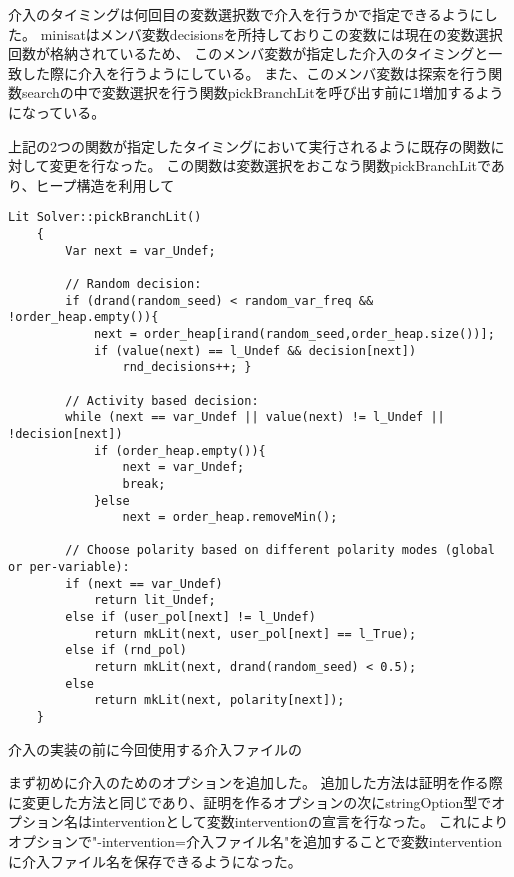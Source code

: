 介入のタイミングは何回目の変数選択数で介入を行うかで指定できるようにした。
minisatはメンバ変数decisionsを所持しておりこの変数には現在の変数選択回数が格納されているため、
このメンバ変数が指定した介入のタイミングと一致した際に介入を行うようにしている。
また、このメンバ変数は探索を行う関数searchの中で変数選択を行う関数pickBranchLitを呼び出す前に1増加するようになっている。

上記の2つの関数が指定したタイミングにおいて実行されるように既存の関数に対して変更を行なった。
この関数は変数選択をおこなう関数pickBranchLitであり、ヒープ構造を利用して

\begin{lstlisting}[caption=関数pickBranchLitの変更による介入の追加(core/Solver.cc), firstnumber=249]
	Lit Solver::pickBranchLit()
	{
    	Var next = var_Undef;

    	// Random decision:
    	if (drand(random_seed) < random_var_freq && !order_heap.empty()){
        	next = order_heap[irand(random_seed,order_heap.size())];
        	if (value(next) == l_Undef && decision[next])
            	rnd_decisions++; }

    	// Activity based decision:
    	while (next == var_Undef || value(next) != l_Undef || !decision[next])
        	if (order_heap.empty()){
        	    next = var_Undef;
        	    break;
        	}else
            	next = order_heap.removeMin();

    	// Choose polarity based on different polarity modes (global or per-variable):
    	if (next == var_Undef)
    	    return lit_Undef;
    	else if (user_pol[next] != l_Undef)
    	    return mkLit(next, user_pol[next] == l_True);
    	else if (rnd_pol)
    	    return mkLit(next, drand(random_seed) < 0.5);
    	else
    	    return mkLit(next, polarity[next]);
	}
\end{lstlisting}



介入の実装の前に今回使用する介入ファイルの


まず初めに介入のためのオプションを追加した。
追加した方法は証明を作る際に変更した方法と同じであり、証明を作るオプションの次にstringOption型でオプション名はinterventionとして変数interventionの宣言を行なった。
これによりオプションで"-intervention=介入ファイル名"を追加することで変数interventionに介入ファイル名を保存できるようになった。

\begin{comment}
	search()
	-pickBranchLit()
	 -rewriteActivity()(新規)
	  -randomActivity()(新規)
	   -rebuildOrderHeap()
\end{comment}